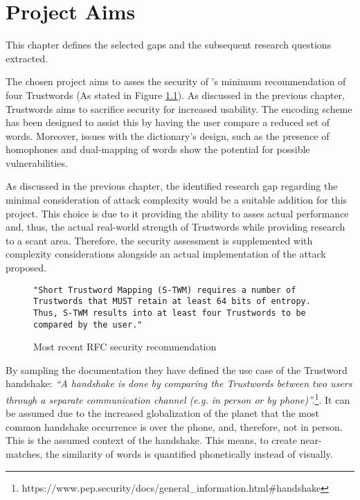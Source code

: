 \chapter{Project Aims}

This chapter defines the selected gaps and the subsequent research questions extracted.

The chosen project aims to asses the security of \pep's minimum recommendation of four Trustwords (As stated in Figure \ref{fig:trustwordsNum}). As discussed in the previous chapter, Trustwords aims to sacrifice security for increased usability. The encoding scheme has been designed to assist this by having  the user compare a reduced set of words. Moreover, issues with the dictionary's design, such as the presence of homophones and dual-mapping of words show the potential for possible vulnerabilities. 

As discussed in the previous chapter, the identified research gap regarding the minimal consideration of attack complexity would be a suitable addition for this project. This choice is due to it providing the ability to asses actual performance and, thus, the actual real-world strength of Trustwords while providing research to a scant area. Therefore, the security assessment is supplemented with complexity considerations alongside an actual implementation of the attack proposed.

\begin{center}
\begin{figure}[h!]
    \centering
        
    \begin{lstlisting}[frame=single, numbers=none]
"Short Trustword Mapping (S-TWM) requires a number of 
Trustwords that MUST retain at least 64 bits of entropy. 
Thus, S-TWM results into at least four Trustwords to be 
compared by the user."
    \end{lstlisting}

    \caption{Most recent RFC security recommendation}
    \label{fig:trustwordsNum}
\end{figure}
\end{center}
By sampling the \pep documentation they have defined the use case of the Trustword handshake: \textit{``A handshake is done by comparing the Trustwords between two users through a separate communication channel (e.g. in person or by phone)''.}\footnote{https://www.pep.security/docs/general\_information.html\#handshake}. It can be assumed due to the increased globalization of the planet that the most common handshake occurrence is over the phone, and, therefore, not in person. This is the assumed context of the handshake. This means, to create near-matches, the similarity of words is quantified phonetically instead of visually.

